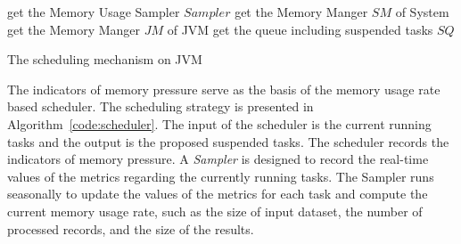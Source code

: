\IncMargin{0.4em}
\SetAlFnt{\small}
\begin{algorithm}[!t]


get the Memory Usage Sampler $Sampler$\;
get the Memory Manger $SM$ of System\;
get the Memory Manger $JM$ of JVM\;
get the queue including suspended tasks $SQ$\;
\lElse{\CST}

\BlankLine
{}
\BlankLine
{}
\caption{The scheduling mechanism on JVM}
\label{code:scheduler}
\end{algorithm}
\DecMargin{0.4em}

The indicators of memory pressure serve as the basis of the memory usage rate based scheduler. The scheduling strategy is presented in Algorithm~\ref{code:scheduler}. The input of the scheduler is the current running tasks and the output is the proposed suspended tasks. The scheduler records the indicators of memory pressure. A \textit{Sampler} is designed to record the real-time values of the metrics regarding the currently running tasks. The Sampler runs seasonally to update the values of the metrics for each task and compute the current memory usage rate, such as the size of input dataset, the number of processed records, and the size of the results.


